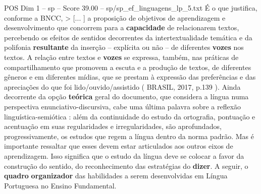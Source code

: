 \begin{textsample}{POS Dim 1 – sp – Score 39.00 – sp/sp\_ef\_linguagens\_lp\_5.txt}
É o que justifica, conforme a BNCC, > [... ] a proposição de objetivos de aprendizagem e desenvolvimento que concorrem para a \textbf{capacidade} de relacionarem textos, percebendo os efeitos de sentidos decorrentes da intertextualidade temática e da polifonia \textbf{resultante} da inserção – explícita ou não – de diferentes \textbf{vozes} nos textos.
A relação entre textos e \textbf{vozes} se expressa, também, nas práticas de compartilhamento que promovem a escuta e a produção de textos, de diferentes gêneros e em diferentes mídias, que se prestam à expressão das preferências e das apreciações do que foi lido/ouvido/assistido ( BRASIL, 2017, p.139 ).
Ainda decorrente da opção \textbf{teórica} geral do documento, que considera a língua numa perspectiva enunciativo-discursiva, cabe uma última palavra sobre a reflexão linguística-semiótica : além da continuidade do estudo da ortografia, pontuação e acentuação em suas regularidades e irregularidades, são aprofundados, progressivamente, os estudos que regem a língua dentro da norma padrão.
Mas é importante ressaltar que esses devem estar articulados aos outros eixos de aprendizagem.
Isso significa que o estudo da língua deve se colocar a favor da construção do sentido, do reconhecimento das estratégias do \textbf{dizer}.
A seguir, o \textbf{quadro} \textbf{organizador} das habilidades a serem desenvolvidas em Língua Portuguesa no Ensino Fundamental.

\end{textsample}
